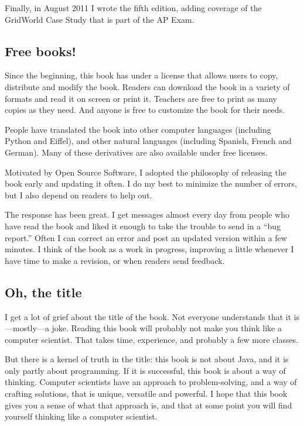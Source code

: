 \documentclass[12pt]{book}
\theoremstyle{definition}
\begin{document}
Finally, in August 2011 I wrote the fifth edition, adding
coverage of the GridWorld Case Study that is part of the AP Exam.


\subsection*{Free books!}

Since the beginning, this book has under a license that allows users
to copy, distribute and modify the book.  Readers can download the
book in a variety of formats and read it on screen or print it.
Teachers are free to print as many copies as they need.  And anyone is
free to customize the book for their needs.

People have translated the book into other computer languages
(including Python and Eiffel), and other natural languages (including
Spanish, French and German).  Many of these derivatives are also
available under free licenses.

Motivated by Open
Source Software, I adopted the philosophy of releasing the
book early and updating it often.  I do my best to minimize the
number of errors, but I also depend on readers to help out.

The response has been great.  I get messages almost every day from
people who have read the book and liked it enough to take the trouble
to send in a ``bug report.''  Often I can correct an error
and post an updated version within a few minutes.  I think of the
book as a work in progress, improving a little whenever I have time
to make a revision, or when readers send feedback.

\subsection*{Oh, the title}

I get a lot of grief about the title of the book.  Not everyone
understands that it is---mostly---a joke.
Reading this book will probably not make you think like a computer
scientist.  That takes time, experience, and probably a few more
classes.

But there is a kernel of truth in the title: this book is not
about Java, and it is only partly about programming.  If it is
successful, this book is about a way of thinking.  Computer scientists
have an approach to problem-solving, and a way of crafting solutions,
that is unique, versatile and powerful.  I hope that this book
gives you a sense of what that approach is, and that at some
point you will find yourself thinking like a computer scientist.
\end{document}
